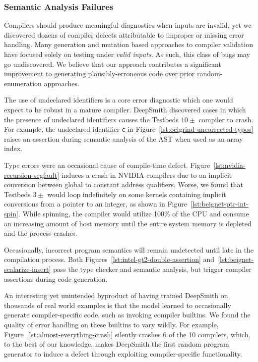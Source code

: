 \subsubsection{Semantic Analysis Failures}

Compilers should produce meaningful diagnostics when inputs are invalid, yet we
discovered dozens of compiler defects attributable to improper or missing error
handling. Many generation and mutation based approaches to compiler validation
have focused solely on testing under \emph{valid inputs}. As such, this class of
bugs may go undiscovered. We believe that our approach contributes a significant
improvement to generating plausibly-erroneous code over prior random-enumeration
approaches.

The use of undeclared identifiers is a core error diagnostic which one would
expect to be robust in a mature compiler. DeepSmith discovered cases in which
the presence of undeclared identifiers causes the Testbeds $10\pm$ compiler to
crash. For example, the undeclared identifier \texttt{c} in
Figure~\ref{lst:oclgrind-uncorrected-typos} raises an assertion during semantic
analysis of the AST when used as an array index.

Type errors were an occasional cause of compile-time defect.
Figure~\ref{lst:nvidia-recursion-segfault} induces a crash in NVIDIA compilers
due to an implicit conversion between global to constant address qualifiers.
Worse, we found that Testbeds $3\pm$ would loop indefinitely on some kernels
containing implicit conversions from a pointer to an integer, as shown in
Figure~\ref{lst:beignet-ptr-int-spin}. While spinning, the compiler would
utilize 100\% of the CPU and consume an increasing amount of host memory until
the entire system memory is depleted and the process crashes.

Occasionally, incorrect program semantics will remain undetected until late in
the compilation process. Both Figures~\ref{lst:intel-gt2-double-assertion}
and~\ref{lst:beignet-scalarize-insert} pass the type checker and semantic
analysis, but trigger compiler assertions during code generation.

An interesting yet unintended byproduct of having trained DeepSmith on thousands
of real world examples is that the model learned to occasionally generate
compiler-specific code, such as invoking compiler builtins. We found the quality
of error handling on these builtins to vary wildly. For example,
Figure~\ref{lst:almost-everything-crash} silently crashes 6 of the 10 compilers,
which, to the best of our knowledge, makes DeepSmith the first random program
generator to induce a defect through exploiting compiler-specific functionality.

